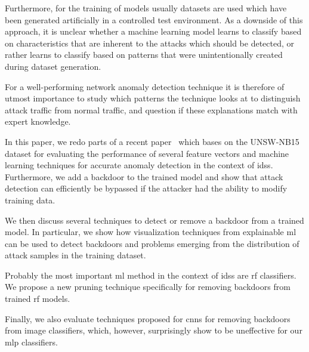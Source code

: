 \documentclass[10pt,sigconf,letterpaper,dvipsnames]{acmart}
\begin{document}
Furthermore, for the training of models usually datasets are used which have been generated artificially in a controlled test environment. As a downside of this approach, it is unclear whether a machine learning model learns to classify based on characteristics that are inherent to the attacks which should be detected, or rather learns to classify based on patterns that were unintentionally created during dataset generation.

For a well-performing network anomaly detection technique it is therefore of utmost importance to study which patterns the technique looks at to distinguish attack traffic from normal traffic, and question if these explanations match with expert knowledge.

In this paper, we redo parts of a recent paper~\cite{meghdouri_analysis_2018} which bases on the UNSW-NB15 dataset \cite{moustafa_unsw-nb15:_2015} for evaluating the performance of several feature vectors and machine learning techniques for accurate anomaly detection in the context of \glspl{ids}.
Furthermore, we add a backdoor to the trained model and show that attack detection can efficiently be bypassed if the attacker had the ability to modify training data.

\newpage
We then discuss several techniques to detect or remove a backdoor from a trained model. In particular, we show how visualization techniques from explainable \gls{ml} can be used to detect backdoors and problems emerging from the distribution of attack samples in the training dataset.

Probably the most important \gls{ml} method in the context of \glspl{ids} are \gls{rf} classifiers. We propose a new pruning technique specifically for removing backdoors from trained \gls{rf} models.

Finally, we also evaluate techniques proposed for \glspl{cnn} for removing backdoors from image classifiers, which, however, surprisingly show to be uneffective for our \gls{mlp} classifiers. 
\end{document}

